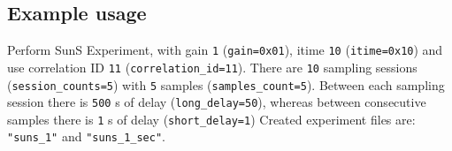 \subsection{Example usage}
Perform SunS Experiment, with gain \texttt{1} (\texttt{gain=0x01}), itime \texttt{10} (\texttt{itime=0x10}) and use correlation ID \texttt{11} (\texttt{correlation\_id=11}). There are \texttt{10} sampling sessions (\texttt{session_counts=5}) with \texttt{5} samples (\texttt{samples_count=5}). Between each sampling session there is \texttt{500} s of delay (\texttt{long_delay=50}), whereas between consecutive samples there is \texttt{1} s of delay (\texttt{short_delay=1})  Created experiment files are: \texttt{"suns_1"} and \texttt{"suns_1_sec"}. 

